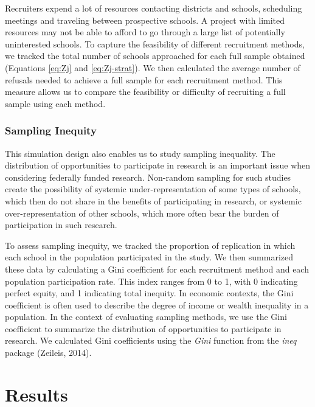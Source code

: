 \documentclass[
  man,floatsintext]{apa6}
\begin{document}
Recruiters expend a lot of resources contacting districts and schools, scheduling meetings and traveling between prospective schools. A project with limited resources may not be able to afford to go through a large list of potentially uninterested schools. To capture the feasibility of different recruitment methods, we tracked the total number of schools approached for each full sample obtained (Equations \eqref{eq:Zj} and \eqref{eq:Zj-strat}). We then calculated the average number of refusals needed to achieve a full sample for each recruitment method. This measure allows us to compare the feasibility or difficulty of recruiting a full sample using each method.

\hypertarget{sampling-inequity}{%
\subsubsection*{Sampling Inequity}\label{sampling-inequity}}

This simulation design also enables us to study sampling inequality. The distribution of opportunities to participate in research is an important issue when considering federally funded research.
Non-random sampling for such studies create the possibility of systemic under-representation of some types of schools, which then do not share in the benefits of participating in research, or systemic over-representation of other schools, which more often bear the burden of participation in such research.

To assess sampling inequity, we tracked the proportion of replication in which each school in the population participated in the study. We then summarized these data by calculating a Gini coefficient for each recruitment method and each population participation rate. This index ranges from 0 to 1, with 0 indicating perfect equity, and 1 indicating total inequity.
In economic contexts, the Gini coefficient is often used to describe the degree of income or wealth inequality in a population. In the context of evaluating sampling methods, we use the Gini coefficient to summarize the distribution of opportunities to participate in research. We calculated Gini coefficients using the \emph{Gini} function from the \emph{ineq} package (Zeileis, 2014).

\hypertarget{results}{%
\section*{Results}\label{results}}
\end{document}
